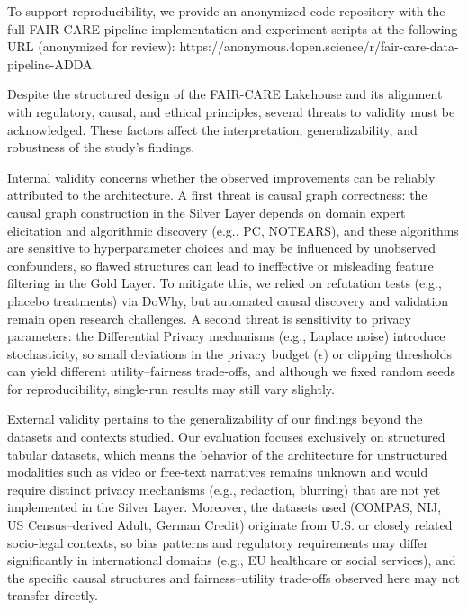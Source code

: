 To support reproducibility, we provide an anonymized code repository with the full FAIR-CARE pipeline implementation and experiment scripts at the following URL (anonymized for review): https://anonymous.4open.science/r/fair-care-data-pipeline-ADDA.


Despite the structured design of the FAIR-CARE Lakehouse and its alignment with regulatory, causal, and ethical principles, several threats to validity must be acknowledged. These factors affect the interpretation, generalizability, and robustness of the study's findings.

Internal validity concerns whether the observed improvements can be reliably attributed to the architecture.
A first threat is causal graph correctness: the causal graph construction in the Silver Layer depends on domain expert elicitation and algorithmic discovery (e.g., PC, NOTEARS), and these algorithms are sensitive to hyperparameter choices and may be influenced by unobserved confounders, so flawed structures can lead to ineffective or misleading feature filtering in the Gold Layer.
To mitigate this, we relied on refutation tests (e.g., placebo treatments) via DoWhy, but automated causal discovery and validation remain open research challenges.
A second threat is sensitivity to privacy parameters: the Differential Privacy mechanisms (e.g., Laplace noise) introduce stochasticity, so small deviations in the privacy budget ($\epsilon$) or clipping thresholds can yield different utility–fairness trade-offs, and although we fixed random seeds for reproducibility, single-run results may still vary slightly.

External validity pertains to the generalizability of our findings beyond the datasets and contexts studied.
Our evaluation focuses exclusively on structured tabular datasets, which means the behavior of the architecture for unstructured modalities such as video or free-text narratives remains unknown and would require distinct privacy mechanisms (e.g., redaction, blurring) that are not yet implemented in the Silver Layer.
Moreover, the datasets used (COMPAS, NIJ, US Census–derived Adult, German Credit) originate from U.S. or closely related socio-legal contexts, so bias patterns and regulatory requirements may differ significantly in international domains (e.g., EU healthcare or social services), and the specific causal structures and fairness–utility trade-offs observed here may not transfer directly.

